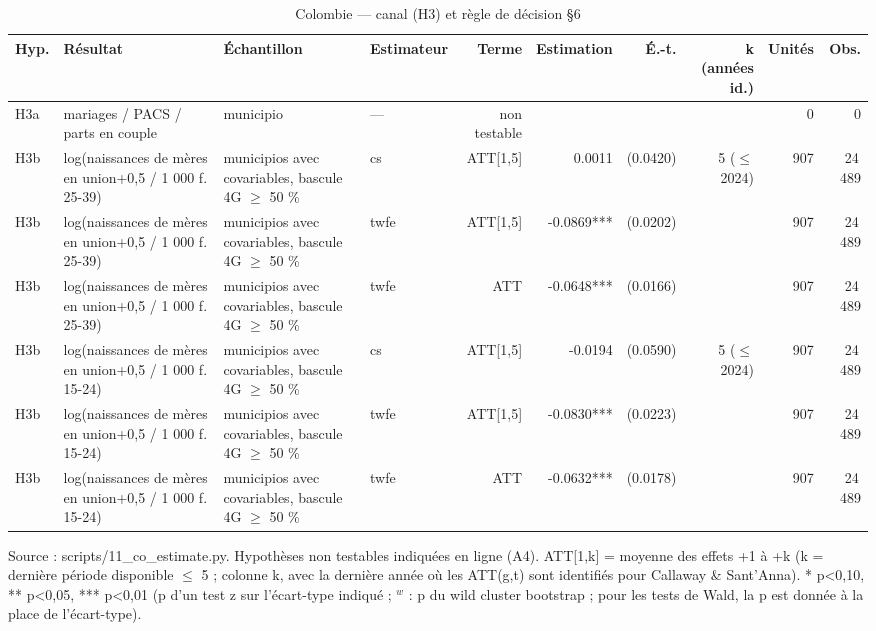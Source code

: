 \begin{table}\centering
\begin{threeparttable}
\caption{Colombie — canal (H3) et règle de décision §6}\label{tab:co_h3}
\scriptsize
\begin{tabular}{lp{6.4cm}p{5.9cm}lrrrrrr}
\toprule
Hyp. & Résultat & Échantillon & Estimateur & Terme & Estimation & É.-t. & k (années id.) & Unités & Obs. \\
\midrule
H3a & mariages / PACS / parts en couple & municipio & — & non testable &  &  &  & 0 & 0 \\
H3b & log(naissances de mères en union+0,5 / 1 000 f. 25-39) & municipios avec covariables, bascule 4G $\geq$ 50 \% & cs & ATT[1,5] & 0.0011 & (0.0420) & 5 ($\leq$ 2024) & 907 & 24\,489 \\
H3b & log(naissances de mères en union+0,5 / 1 000 f. 25-39) & municipios avec covariables, bascule 4G $\geq$ 50 \% & twfe & ATT[1,5] & -0.0869*** & (0.0202) &  & 907 & 24\,489 \\
H3b & log(naissances de mères en union+0,5 / 1 000 f. 25-39) & municipios avec covariables, bascule 4G $\geq$ 50 \% & twfe & ATT & -0.0648*** & (0.0166) &  & 907 & 24\,489 \\
H3b & log(naissances de mères en union+0,5 / 1 000 f. 15-24) & municipios avec covariables, bascule 4G $\geq$ 50 \% & cs & ATT[1,5] & -0.0194 & (0.0590) & 5 ($\leq$ 2024) & 907 & 24\,489 \\
H3b & log(naissances de mères en union+0,5 / 1 000 f. 15-24) & municipios avec covariables, bascule 4G $\geq$ 50 \% & twfe & ATT[1,5] & -0.0830*** & (0.0223) &  & 907 & 24\,489 \\
H3b & log(naissances de mères en union+0,5 / 1 000 f. 15-24) & municipios avec covariables, bascule 4G $\geq$ 50 \% & twfe & ATT & -0.0632*** & (0.0178) &  & 907 & 24\,489 \\
\bottomrule
\end{tabular}
\begin{tablenotes}\footnotesize
\item Source : scripts/11\_co\_estimate.py. Hypothèses non testables indiquées en ligne (A4). ATT[1,k] = moyenne des effets +1 à +k (k = dernière période disponible $\leq$ 5 ; colonne k, avec la dernière année où les ATT(g,t) sont identifiés pour Callaway \& Sant'Anna). * p<0,10, ** p<0,05, *** p<0,01 (p d'un test z sur l'écart-type indiqué ; $^{w}$ : p du wild cluster bootstrap ; pour les tests de Wald, la p est donnée à la place de l'écart-type).
\end{tablenotes}
\end{threeparttable}
\end{table}
